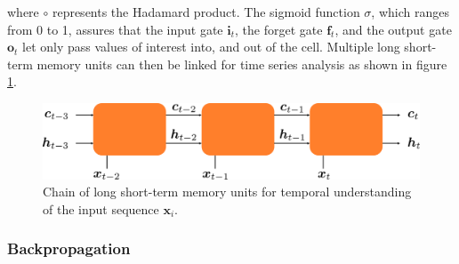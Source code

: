 where $\circ$ represents the Hadamard product. The sigmoid function $\sigma$, which ranges from 0 to 1, assures that the input gate $\bm{i}_t$, the forget gate $\bm{f}_t$, and the output gate $\bm{o}_t$ let only pass values of interest into, and out of the cell. Multiple long short-term memory units can then be linked for time series analysis as shown in figure \ref{fig::321_lstm_chain}.
\begin{figure}[h]
	\centering
	\includegraphics[scale=.28]{chapters/03_background/img/lstm_chain.png}
	\caption{Chain of long short-term memory units for temporal understanding of the input sequence $\bm{x}_i$.}
	\label{fig::321_lstm_chain}
\end{figure}
\subsubsection{Backpropagation}
\cite{linnainmaa1970representation}
